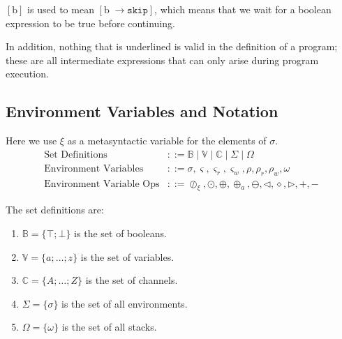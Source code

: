 \documentclass[times,10pt]{article}
\begin{document}
$[\textrm{b}]$ is used to mean $[\textrm{b} \; \rightarrow \mathtt{skip}]$, which means that we wait for a boolean expression to be true before continuing.

In addition, nothing that is underlined is valid in the definition of a program; these are all intermediate expressions that can only arise during program execution.

\subsection{Environment Variables and Notation}
Here we use $\xi$ as a metasyntactic variable for the elements of $\sigma$.
\begin{align*}
    \text{Set Definitions} & ::= \mathbb{B} \; | \; \mathbb{V} \; | \; \mathbb{C} \; | \; \Sigma \; | \; \Omega \\
    \text{Environment Variables} & ::= \sigma, \varsigma, \varsigma_r, \varsigma_w, \rho, \rho_r, \rho_w, \omega \\
    \text{Environment Variable Ops} & ::= \oslash_\xi, \odot, \oplus, \oplus_a, \ominus, \triangleleft, \diamond, \triangleright, +, -
\end{align*}

The set definitions are:
\begin{enumerate}
    \item $\mathbb{B} = \{\top; \bot\}$ is the set of booleans.
    \item $\mathbb{V} = \{a; \ldots; z\}$ is the set of variables.
    \item $\mathbb{C} = \{A; \ldots; Z\}$ is the set of channels.
    \item $\Sigma = \{\sigma\}$ is the set of all environments.
    \item $\Omega = \{\omega\}$ is the set of all stacks.
\end{enumerate}
\end{document}
